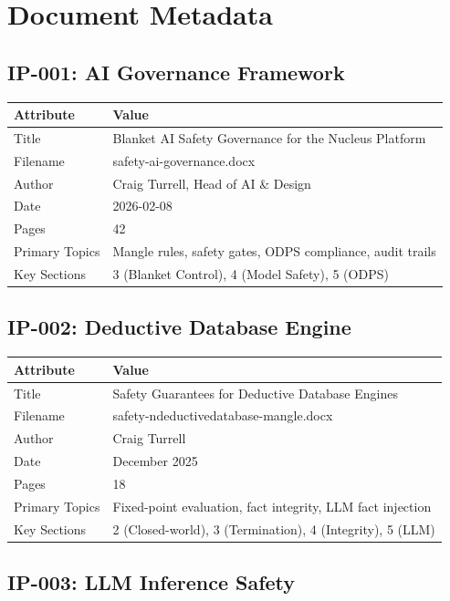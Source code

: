 \section{Document Metadata}

\subsection{IP-001: AI Governance Framework}

\begin{tabularx}{\textwidth}{@{}lX@{}}
\toprule
\textbf{Attribute} & \textbf{Value} \\
\midrule
Title & Blanket AI Safety Governance for the Nucleus Platform \\
Filename & safety-ai-governance.docx \\
Author & Craig Turrell, Head of AI \& Design \\
Date & 2026-02-08 \\
Pages & 42 \\
Primary Topics & Mangle rules, safety gates, ODPS compliance, audit trails \\
Key Sections & 3 (Blanket Control), 4 (Model Safety), 5 (ODPS) \\
\bottomrule
\end{tabularx}

\subsection{IP-002: Deductive Database Engine}

\begin{tabularx}{\textwidth}{@{}lX@{}}
\toprule
\textbf{Attribute} & \textbf{Value} \\
\midrule
Title & Safety Guarantees for Deductive Database Engines \\
Filename & safety-ndeductivedatabase-mangle.docx \\
Author & Craig Turrell \\
Date & December 2025 \\
Pages & 18 \\
Primary Topics & Fixed-point evaluation, fact integrity, LLM fact injection \\
Key Sections & 2 (Closed-world), 3 (Termination), 4 (Integrity), 5 (LLM) \\
\bottomrule
\end{tabularx}

\subsection{IP-003: LLM Inference Safety}

